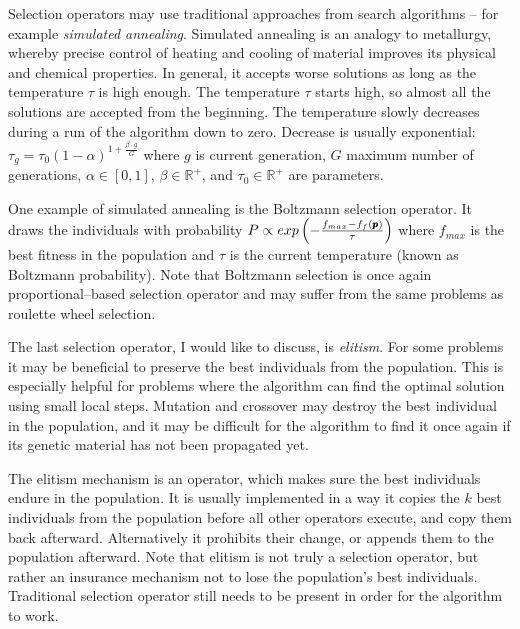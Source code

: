 Selection operators may use traditional approaches from search algorithms -- for example \emph{simulated annealing}. Simulated annealing is an analogy to metallurgy, whereby precise control of heating and cooling of material improves its physical and chemical properties. In general, it accepts worse solutions as long as the temperature $\tau$ is high enough. The temperature $\tau$ starts high, so almost all the solutions are accepted from the beginning. The temperature slowly decreases during a run of the algorithm down to zero. Decrease is usually exponential: $\tau_g=\tau_0(1-\alpha)^{1+\frac{\beta\cdot g}{G}}$ where $g$ is current generation, $G$ maximum number of generations, $\alpha\in\left[0,1\right]$, $\beta\in\mathbb{R}^+$, and $\tau_0\in\mathbb{R}^+$ are parameters. 

One example of simulated annealing is the Boltzmann selection operator. It draws the individuals with probability 
$P\propto exp\left(-\frac{f_{max} - f_f(\pmb{p})}{\tau}\right)$
where $f_{max}$ is the best fitness in the population and $\tau$ is the current temperature (known as Boltzmann probability). Note that Boltzmann selection is once again proportional--based selection operator and may suffer from the same problems as roulette wheel selection.

The last selection operator, I would like to discuss, is \emph{elitism}. For some problems it may be beneficial to preserve the best individuals from the population. This is especially helpful for problems where the algorithm can find the optimal solution using small local steps. Mutation and crossover may destroy the best individual in the population, and it may be difficult for the algorithm to find it once again if its genetic material has not been propagated yet.

The elitism mechanism is an operator, which makes sure the best individuals endure in the population. It is usually implemented in a way it copies the $k$ best individuals from the population before all other operators execute, and copy them back afterward. Alternatively it prohibits their change, or appends them to the population afterward. Note that elitism is not truly a selection operator, but rather an insurance mechanism not to lose the population's best individuals. Traditional selection operator still needs to be present in order for the algorithm to work. 




